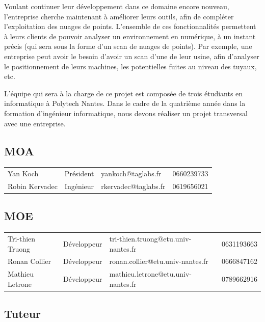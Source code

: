 \documentclass[12pt,titlepage,french]{article}
\begin{document}
Voulant continuer leur développement dans ce domaine encore nouveau, l'entreprise cherche maintenant à améliorer leurs outils, afin de compléter l'exploitation des nuages de points. L'ensemble de ces fonctionnalités permettent à leurs clients de pouvoir analyser un environnement en numérique, à un instant précis (qui sera sous la forme d'un scan de nuages de points). Par exemple, une entreprise peut avoir le besoin d'avoir un scan d'une de leur usine, afin d'analyser le positionnement de leurs machines, les potentielles fuites au niveau des tuyaux, etc.

L'équipe qui sera à la charge de ce projet est composée de trois étudiants en informatique à Polytech Nantes. Dans le cadre de la quatrième année dans la formation d'ingénieur informatique, nous devons réaliser un projet transversal avec une entreprise.
\subsection*{MOA}

\noindent\begin{tabu} to \textwidth {X[c]X[c]X[c]X[c]}\toprule
   &&        &\\\toprule
      Yan Koch&   Président&  yankoch@taglabs.fr&    0660239733\\\midrule
Robin Kervadec&   Ingénieur&rkervadec@taglabs.fr&    0619656021\\\bottomrule
\end{tabu}

\subsection*{MOE}

\noindent\begin{tabu} to \textwidth {X[c2]X[c]X[c3]X[c]}\toprule
     &&                       &\\\toprule
Tri-thien Truong& Développeur&tri-thien.truong@etu.univ-nantes.fr&    0631193663\\\midrule
   Ronan Collier& Développeur&   ronan.collier@etu.univ-nantes.fr&    0666847162\\\midrule
 Mathieu Letrone& Développeur& mathieu.letrone@etu.univ-nantes.fr&    0789662916\\\bottomrule
\end{tabu}

\subsection*{Tuteur}
\end{document}

